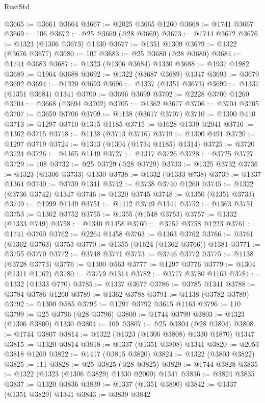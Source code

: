 \begin{lexlean}{RustStd}
\begin{coremodule}
@3665 := @3661 @3664
@3667 := @2025 @3665 @1260
@3668 := @1741 @3667
@3669 := 106
@3672 := @25 @3669 (@28 @3669)
@3673 := @1744 @3672
@3676 := @1323 (@1306 @3673) @1330
@3677 := @1351 @1309
@3679 := @1322 (@3676 @3677)
@3680 := 107
@3683 := @25 @3680 (@28 @3680)
@3684 := @1744 @3683
@3687 := @1323 (@1306 @3684) @1330
@3688 := @1937 @1982
@3689 := @1964 @3688
@3692 := @1322 (@3687 @3689) @1347
@3693 := @3679 @3692
@3694 := @1320 @3693
@3696 := @1337 (@1351 @3673)
@3699 := @1337 (@1351 @3684) @1341
@3700 := @3696 @3699
@3702 := @2228 @3700 @1260
@3704 := @3668 (@3694 @3702)
@3705 := @1362 @3677
@3706 := @3704 @3705
@3707 := @3659 @3706
@3709 := @1138 (@3617 @3707)
@3710 := @1300 @410
@3713 := @1297 @3710 @1315 @1185
@3715 := @1628 @1339 @2041
@3716 := @1362 @3715
@3718 := @1138 (@3713 @3716)
@3719 := @1300 @491
@3720 := @1297 @3719
@3724 := @1313 (@1304 (@1734 @1185) @1314)
@3725 := @3720 @3724
@3726 := @1165 @1149
@3727 := @1317 @3726
@3728 := @3725 @3727
@3729 := 108
@3732 := @25 @3729 (@28 @3729)
@3733 := @1325 @3732
@3736 := @1323 (@1306 @3733) @1330
@3738 := @1332 (@1333 @738)
@3739 := @1337 @1364
@3740 := @3739 @1341
@3742 := @3738 @3740 @1260
@3745 := @1322 (@3736 @3742) @1347
@3746 := @1320 @3745
@3748 := @1350 (@1351 @3733)
@3749 := @1999 @1149
@3751 := @1412 @3749 @1341
@3752 := @1363 @3751
@3753 := @1362 @3752
@3755 := @1355 (@1548 @3753)
@3757 := @1332 (@1333 @749)
@3758 := @1340 @1458
@3760 := @3757 @3758 @1223
@3761 := @1741 @3760
@3762 := @2264 @1458
@3763 := @1363 @3762
@3766 := @3761 (@1362 @3763) @3753
@3770 := @1355 (@1624 (@1362 @3766)) @1381
@3771 := @3755 @3770
@3772 := @3748 @3771
@3773 := @3746 @3772
@3775 := @1138 (@3728 @3773)
@3776 := @1300 @563
@3777 := @1297 @3776
@3779 := @1304 (@1311 @1162)
@3780 := @3779 @1314
@3782 := @3777 @3780 @1163
@3784 := @1332 (@1333 @770)
@3785 := @1337 @3677
@3786 := @3785 @1341
@3788 := @3784 @3786 @1260
@3789 := @1362 @3788
@3791 := @1138 (@3782 @3789)
@3792 := @1300 @585
@3795 := @1297 @3792 @3615 @1163
@3796 := 110
@3799 := @25 @3796 (@28 @3796)
@3800 := @1744 @3799
@3803 := @1323 (@1306 @3800) @1330
@3804 := 109
@3807 := @25 @3804 (@28 @3804)
@3808 := @1744 @3807
@3814 := @1322 (@1323 (@1306 @3808) @1330 @1870) @1347
@3815 := @1320 @3814
@3818 := @1337 (@1351 @3808) @1341
@3820 := @2053 @3818 @1260
@3822 := @1417 (@3815 @3820)
@3824 := @1322 (@3803 @3822)
@3825 := 111
@3828 := @25 @3825 (@28 @3825)
@3829 := @1744 @3828
@3835 := @1322 (@1323 (@1306 @3829) @1330 @2009) @1347
@3836 := @3824 @3835
@3837 := @1320 @3836
@3839 := @1337 (@1351 @3800)
@3842 := @1337 (@1351 @3829) @1341
@3843 := @3839 @3842

\end{coremodule}
\end{lexlean}
